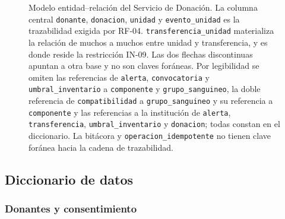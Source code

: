 \documentclass[11pt,a4paper]{article}
\begin{document}
\begin{figure}[h!]
\caption[Modelo entidad--relación del Servicio de Donación]{Modelo entidad--relación del Servicio de Donación. La columna central \texttt{donante}, \texttt{donacion}, \texttt{unidad} y \texttt{evento\_unidad} es la trazabilidad exigida por RF-04. \texttt{transferencia\_unidad} materializa la relación de muchos a muchos entre unidad y transferencia, y es donde reside la restricción IN-09. Las dos flechas discontinuas apuntan a otra base y no son claves foráneas. Por legibilidad se omiten las referencias de \texttt{alerta}, \texttt{convocatoria} y \texttt{umbral\_inventario} a \texttt{componente} y \texttt{grupo\_sanguineo}, la doble referencia de \texttt{compatibilidad} a \texttt{grupo\_sanguineo} y su referencia a \texttt{componente} y las referencias a la institución de \texttt{alerta}, \texttt{transferencia}, \texttt{umbral\_inventario} y \texttt{donacion}; todas constan en el diccionario. La bitácora y \texttt{operacion\_idempotente} no tienen clave foránea hacia la cadena de trazabilidad.}
\label{fig:erdonacion}
\end{figure}

\subsection{Diccionario de datos}

\subsubsection{Donantes y consentimiento}
\end{document}

